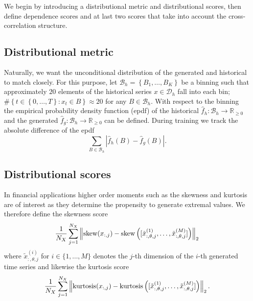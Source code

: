 \documentclass[]{article} %
\begin{document}
We begin by introducing a distributional metric and distributional scores, then define dependence scores and at last two scores that take into account the cross-correlation structure. 

\subsection{Distributional metric}
Naturally, we want the unconditional distribution of the generated and historical to match closely. For this purpose, let $\mathcal{B}_h = \left\lbrace B_1, \dots, B_{K}\right\rbrace$ be a binning such that approximately $20$ elements of the historical series $x \in \mathcal{D}_h$ fall into each bin; $\# \left\lbrace t \in \left\lbrace 0, \dots, T \right\rbrace: x_{t}  \in B \right\rbrace \approx 20$ for any $ B \in \mathcal{B}_h$. With respect to the binning the empirical probability density function (epdf) of the historical ${\hat f_h: \mathcal{B}_h \to \mathbb{R}_{\geq 0}}$ and the generated $\hat f_g: \mathcal{B}_h \to \mathbb{R}_{\geq 0}$ can be defined. 
During training we track the absolute difference of the epdf
\[
\sum_{B \in \mathcal{B}_h} |\hat f_h(B) - \hat f_g(B)|.
\]
\subsection{Distributional scores}
In financial applications higher order moments such as the skewness and kurtosis are of interest as they determine the propensity to generate extremal values. We therefore define the skewness score
\[
\frac{1}{N_X}\sum_{j=1}^{N_X}\left\| \operatorname*{\operatorname{skew}}({x_{:, j}})  - \operatorname*{\operatorname{skew}}\left({[\tilde x_{:,\theta, j}^{(1)}, \dots, \tilde x_{:, \theta, j}^{(M)}]}\right)\right\|_2
\]
where $\tilde x_{:,\theta, j}^{(i)}$ for $i \in \{1, \dots, M\}$ denotes the $j$-th dimension of the $i$-th generated time series and likewise the kurtosis score
\[
\frac{1}{N_X}\sum_{j=1}^{N_X}\left\| \operatorname*{\operatorname{kurtosis}}({x_{:, j}})  - \operatorname*{\operatorname{kurtosis}}\left({[\tilde x_{:,\theta, j}^{(1)}, \dots, \tilde x_{:, \theta, j}^{(M)}]}\right)\right\|_2.
\]
\end{document}
